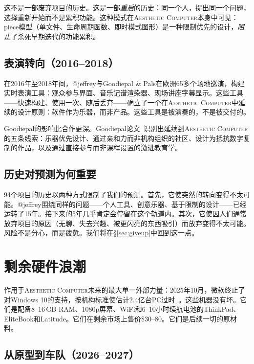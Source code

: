 \documentclass[10pt,letterpaper,twocolumn]{article}
\newcommand{\ac}{\textsc{Aesthetic Computer}}
\begin{document}
这不是一部废弃项目的历史。这是一部\emph{重启}的历史：同一个人，提出同一个问题，选择重新开始而不是累积功能。这种模式在\ac{}本身中可见：piece模型（单文件、生命周期函数、即时模式图形）是一种限制优先的设计，\emph{阻止}了杀死早期迭代的功能累积。

\subsection{表演转向（2016--2018）}

在2016年至2018年间，@jeffrey与Goodiepal \& Pals在欧洲65多个场地巡演，构建实时表演工具：观众参与界面、音乐记谱渲染器、现场讲座字幕显示。这些工具——快速构建、使用一次、随后丢弃——确立了一个在\ac{}中延续的设计原则：软件作为乐器，而非产品。这些工具是被演奏的，不是被交付的。

Goodiepal的影响比合作更深。Goodiepal论文~\citep{scudder2026goodiepal}识别出延续到\ac{}的五条线索：乐器优先设计、通过亲和力而非机构组织的社区、设计为抵抗数字复制的作品，以及通过直接参与而非课程设置的激进教育学。

\subsection{历史对预测为何重要}

94个项目的历史以两种方式限制了我们的预测。首先，它使突然的转向变得不太可能。@jeffrey围绕同样的问题——个人工具、创意乐器、基于限制的设计——已经运转了15年。接下来的5年几乎肯定会停留在这个轨道内。其次，它使因人们通常放弃项目的原因（无聊、失去兴趣、被更闪亮的东西吸引）而放弃变得不太可能。风险不是分心，而是疲惫。我们将在\S\ref{sec:giveup}中回到这一点。


\section{剩余硬件浪潮}
\label{sec:surplus}

作用于\ac{}未来的最大单一外部力量：2025年10月，微软终止了对Windows 10的支持，按机构标准使估计2.4亿台PC过时~\citep{ewaste2024monitor}。这些机器没有坏。它们是配备8--16\,GB RAM、1080p屏幕、WiFi和6--10小时续航电池的ThinkPad、EliteBook和Latitude。它们在剩余市场上售价\$30--80。它们是后续一切的原材料。

\subsection{从原型到车队（2026--2027）}
\end{document}
